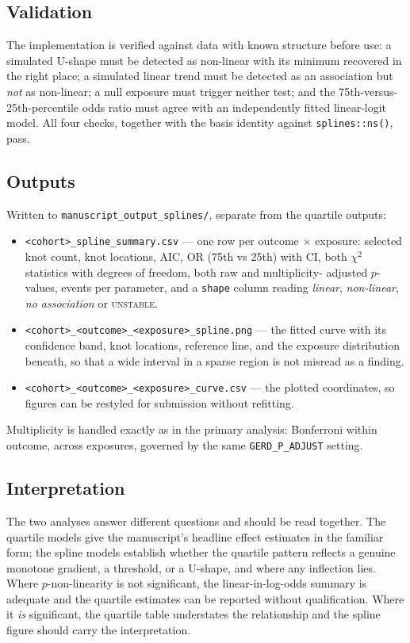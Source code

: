 \documentclass[11pt]{article}
\newcommand{\code}[1]{\texttt{\small #1}}
\begin{document}
\subsection{Validation} The implementation is verified against data with known
structure before use: a simulated U-shape must be detected as non-linear with
its minimum recovered in the right place; a simulated linear trend must be
detected as an association but \emph{not} as non-linear; a null exposure must
trigger neither test; and the 75th-versus-25th-percentile odds ratio must agree
with an independently fitted linear-logit model. All four checks, together with
the basis identity against \code{splines::ns()}, pass.

\subsection{Outputs} Written to \code{manuscript\_output\_splines/}, separate
from the quartile outputs:

\begin{itemize}
\item \code{<cohort>\_spline\_summary.csv} --- one row per outcome $\times$
exposure: selected knot count, knot locations, AIC, OR (75th vs 25th) with CI,
both $\chi^2$ statistics with degrees of freedom, both raw and multiplicity-
adjusted $p$-values, events per parameter, and a \code{shape} column reading
\emph{linear}, \emph{non-linear}, \emph{no association} or \textsc{unstable}.
\item \code{<cohort>\_<outcome>\_<exposure>\_spline.png} --- the fitted curve
with its confidence band, knot locations, reference line, and the exposure
distribution beneath, so that a wide interval in a sparse region is not misread
as a finding.
\item \code{<cohort>\_<outcome>\_<exposure>\_curve.csv} --- the plotted
coordinates, so figures can be restyled for submission without refitting.
\end{itemize}

Multiplicity is handled exactly as in the primary analysis: Bonferroni within
outcome, across exposures, governed by the same \code{GERD\_P\_ADJUST} setting.

\subsection{Interpretation} The two analyses answer different questions and
should be read together. The quartile models give the manuscript's headline
effect estimates in the familiar form; the spline models establish whether the
quartile pattern reflects a genuine monotone gradient, a threshold, or a
U-shape, and where any inflection lies. Where $p$-non-linearity is not
significant, the linear-in-log-odds summary is adequate and the quartile
estimates can be reported without qualification. Where it \emph{is} significant,
the quartile table understates the relationship and the spline figure should
carry the interpretation.
\end{document}
